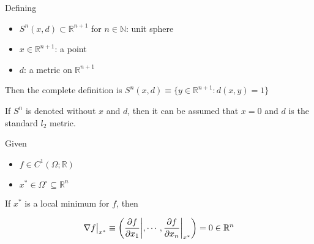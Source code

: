 \begin{definition}
    
    Defining
    \begin{itemize}
        \item $S^n(x,d)\subset \mathbb{R}^{n+1}$ for $n \in \mathbb{N}$: unit sphere
        \item $x\in \mathbb{R}^{n+1}$: a point
        \item $d$: a metric on $\mathbb{R}^{n+1}$
    \end{itemize}

    Then the complete definition is $S^n(x,d) \equiv \{y\in \mathbb{R}^{n+1} : d(x,y) = 1\}$

    \begin{remark}
        If $S^n$ is denoted without $x$ and $d$, then it can be assumed that $x=0$ and $d$ is the standard $l_2$ metric.
    \end{remark}
    
\end{definition}

\begin{theorem}
    
    Given
    \begin{itemize}
        \item $f\in C^1(\Omega;\mathbb{R})$
        \item $x^* \in \Omega^\circ \subseteq \mathbb{R}^n$
    \end{itemize}

    If $x^*$ is a local minimum for $f$, then
    
    \begin{equation*}
        \nabla f\big|_{x^*} \equiv \bigg(\pdv{f}{x_1}\bigg|,\cdots,\pdv{f}{x_n}\bigg|_{x^*}\bigg) = 0 \in \mathbb{R}^n
    \end{equation*}
    
\end{theorem}

